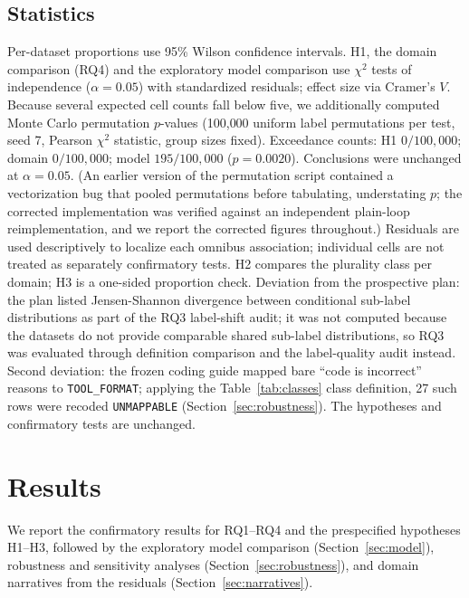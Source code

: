 \documentclass[12pt,letterpaper]{article}
\begin{document}
\subsection{Statistics}
\label{sec:stats}
Per-dataset proportions use 95\% Wilson confidence intervals. H1, the domain
comparison (RQ4) and the exploratory model comparison use $\chi^2$ tests of
independence ($\alpha{=}0.05$) with standardized residuals; effect size via
Cramer's $V$. Because several expected cell counts fall below five, we
additionally computed Monte Carlo permutation $p$-values (100{,}000 uniform
label permutations per test, seed 7, Pearson $\chi^2$ statistic, group sizes
fixed). Exceedance counts: H1 $0/100{,}000$; domain $0/100{,}000$; model
$195/100{,}000$ ($p{=}0.0020$). Conclusions were unchanged at
$\alpha{=}0.05$. (An earlier version of the permutation script contained a
vectorization bug that pooled permutations before tabulating, understating
$p$; the corrected implementation was verified against an independent
plain-loop reimplementation, and we report the corrected figures
throughout.) Residuals are used descriptively to localize each omnibus
association; individual cells are not treated as separately confirmatory
tests. H2 compares the plurality class per domain; H3 is a one-sided
proportion check. Deviation from the prospective plan: the plan listed
Jensen-Shannon divergence between conditional sub-label distributions as
part of the RQ3 label-shift audit; it was not computed because the datasets
do not provide comparable shared sub-label distributions, so RQ3 was
evaluated through definition comparison and the label-quality audit instead.
Second deviation: the frozen coding guide mapped bare ``code is incorrect''
reasons to \texttt{TOOL\_FORMAT}; applying the Table~\ref{tab:classes} class
definition, 27 such rows were recoded \texttt{UNMAPPABLE}
(Section~\ref{sec:robustness}). The hypotheses and confirmatory tests are unchanged.

\section{Results}
We report the confirmatory results for RQ1--RQ4 and the prespecified hypotheses H1--H3, followed by the exploratory model comparison (Section~\ref{sec:model}), robustness and sensitivity analyses (Section~\ref{sec:robustness}), and domain narratives from the residuals (Section~\ref{sec:narratives}).
\end{document}
